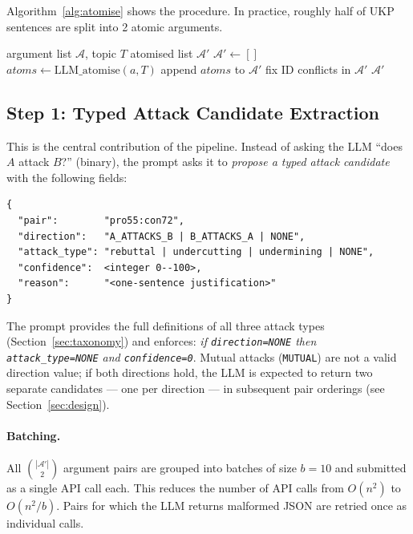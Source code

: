 \documentclass[runningheads]{llncs}
\begin{document}
Algorithm~\ref{alg:atomise} shows the procedure. In practice, roughly
half of UKP sentences are split into 2 atomic arguments.

\begin{algorithm}[t]
\caption{Argument Atomisation}
\label{alg:atomise}
\begin{algorithmic}[1]
\Require argument list $\mathcal{A}$, topic $T$
\Ensure atomised list $\mathcal{A}'$
\State $\mathcal{A}' \gets []$
  \State $\textit{atoms} \gets \mathrm{LLM\_atomise}(a, T)$
  \State append $\textit{atoms}$ to $\mathcal{A}'$
\EndFor
\State fix ID conflicts in $\mathcal{A}'$
\Return $\mathcal{A}'$
\end{algorithmic}
\end{algorithm}

\subsection{Step 1: Typed Attack Candidate Extraction}
\label{sec:extraction}

This is the central contribution of the pipeline. Instead of asking the
LLM ``does $A$ attack $B$?'' (binary), the prompt asks it to
\emph{propose a typed attack candidate} with the following fields:

\begin{lstlisting}[style=json]
{
  "pair":        "pro55:con72",
  "direction":   "A_ATTACKS_B | B_ATTACKS_A | NONE",
  "attack_type": "rebuttal | undercutting | undermining | NONE",
  "confidence":  <integer 0--100>,
  "reason":      "<one-sentence justification>"
}
\end{lstlisting}

The prompt provides the full definitions of all three attack types
(Section~\ref{sec:taxonomy}) and enforces: \emph{if
\texttt{direction=NONE} then \texttt{attack\_type=NONE} and
\texttt{confidence=0}}. Mutual attacks (\texttt{MUTUAL}) are
not a valid direction value; if both directions hold, the LLM
is expected to return two separate candidates — one per direction
— in subsequent pair orderings (see Section~\ref{sec:design}).

\paragraph{Batching.} All $\binom{|\mathcal{A}'|}{2}$ argument pairs are
grouped into batches of size $b=10$ and submitted as a single API call
each. This reduces the number of API calls from $O(n^2)$ to
$O(n^2 / b)$. Pairs for which the LLM returns malformed JSON are retried
once as individual calls.
\end{document}

